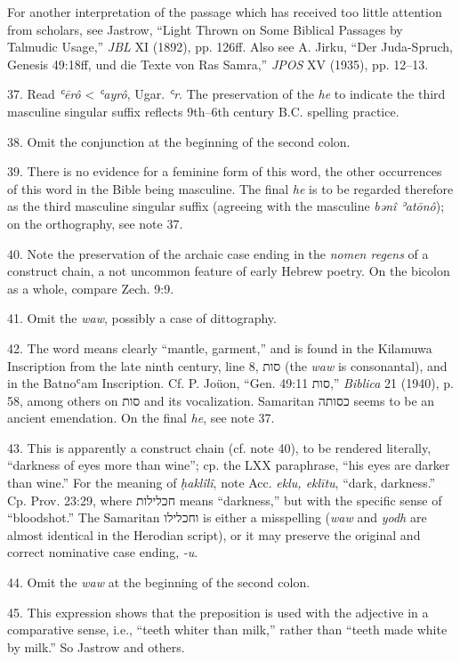 \begin{enumerate}
For another interpretation of the passage which has received too little
attention from scholars, see Jastrow, ``Light Thrown on Some Biblical Passages
by Talmudic Usage,'' \emph{JBL} XI (1892), pp. 126ff. Also see A. Jirku,
``Der Juda-Spruch, Genesis 49:18ff, und die Texte von Ras Samra,'' \emph{JPOS}
XV (1935), pp. 12--13.

37. Read \emph{ʿērô} < \emph{ʿayrô}, Ugar. \emph{ʿr}. The preservation of
the \emph{he} to indicate the third masculine singular suffix reflects
9th--6th century B.C. spelling practice.

38. Omit the conjunction at the beginning of the second colon.

39. There is no evidence for a feminine form of this word, the other
occurrences of this word in the Bible being masculine. The final \emph{he} is
to be regarded therefore as the third masculine singular suffix (agreeing with
the masculine \emph{bənî ʾatōnô}); on the orthography, see note 37.

40. Note the preservation of the archaic case ending in the \emph{nomen
regens} of a construct chain, a not uncommon feature of early Hebrew poetry.
On the bicolon as a whole, compare Zech. 9:9.

41. Omit the \emph{waw}, possibly a case of dittography.

42. The word means clearly ``mantle, garment,'' and is found in the Kilamuwa
Inscription from the late ninth century, line 8, סות (the \emph{waw} is
consonantal), and in the Batnoʿam Inscription. Cf. P. Joüon, ``Gen. 49:11
סות,'' \emph{Biblica} 21 (1940), p. 58, among others on סות and its
vocalization. Samaritan כסותה seems to be an ancient emendation. On the final
\emph{he}, see note 37.

43. This is apparently a construct chain (cf. note 40), to be rendered
literally, ``darkness of eyes more than wine''; cp. the LXX paraphrase, ``his
eyes are darker than wine.'' For the meaning of \emph{ḥaklîlî}, note Acc.
\emph{eklu, eklītu}, ``dark, darkness.'' Cp. Prov. 23:29, where חכלילות means
``darkness,'' but with the specific sense of ``bloodshot.'' The Samaritan
וחכלילו is either a misspelling (\emph{waw} and \emph{yodh} are almost
identical in the Herodian script), or it may preserve the original and correct
nominative case ending, \emph{-u}.

44. Omit the \emph{waw} at the beginning of the second colon.

45. This expression shows that the preposition is used with the adjective in a
comparative sense, i.e., ``teeth whiter than milk,'' rather than ``teeth made
white by milk.'' So Jastrow and others.


\end{enumerate}
